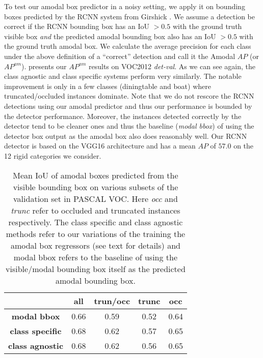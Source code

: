 To test our amodal box predictor in a noisy setting, we apply it on bounding boxes predicted by the RCNN\cite{girshick2013rich} system from Girshick \etal. We assume a detection be correct if the RCNN bounding box has an IoU $> 0.5$ with the ground truth visible box \textit{and} the predicted amodal bounding box also has an IoU $> 0.5$ with the ground truth amodal box. We calculate the average precision for each class under the above definition of a ``correct'' detection and call it the Amodal $AP$ (or $AP^{am}$).  presents our $AP^{am}$ results on VOC2012 \textit{det-val}. As we can see again, the class agnostic and class specific systems perform very similarly. The notable improvement is only in a few classes (\eg diningtable and boat) where truncated/occluded instances dominate. Note that we do not rescore the RCNN detections using our amodal predictor and thus our performance is bounded by the detector performance. Moreover, the instances detected correctly by the detector tend to be cleaner ones and thus the baseline (\textit{modal bbox}) of using the detector box output as the amodal box also does reasonably well. Our RCNN detector is based on the VGG16 \cite{simonyan2014very} architecture and has a mean $AP$ of $57.0$ on the 12 rigid categories we consider.

\begin{table}[htb!]
\centering
\begin{tabular}{ccccc}
\toprule
& \textbf{all} & \textbf{trun/occ} & \textbf{trunc} & \textbf{occ} \tabularnewline
\midrule

\textbf{modal bbox} & 0.66 & 0.59 & 0.52 & 0.64 \tabularnewline
\textbf{class specific} & 0.68 & 0.62 & 0.57 & 0.65 \tabularnewline
\textbf{class agnostic} & 0.68 & 0.62 & 0.56 & 0.65 \tabularnewline

\bottomrule
\end{tabular}
\caption{Mean IoU of amodal boxes predicted from the visible bounding box on various subsets of the validation set in PASCAL VOC. Here \textit{occ} and \textit{trunc} refer to occluded and truncated instances respectively. The class specific and class agnostic methods refer to our variations of the training the amodal box regressors (see text for details) and modal bbox refers to the baseline of using the visible/modal bounding box itself as the predicted amodal bounding box.}
\end{table}

